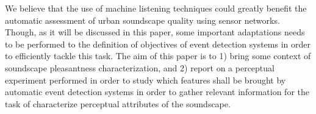 \documentclass{article}
\begin{document}
\begin{sloppy}



We believe that the use of machine listening techniques could greatly benefit the automatic assessment of urban soundscape quality using sensor networks. Though, as it will be discussed in this paper, some important adaptations needs to be performed to the definition of objectives of event detection systems in order to efficiently tackle this task. The aim of this paper is to 1) bring some context of soundscape pleasantness characterization, and 2) report on a perceptual experiment performed in order to study which features shall be brought by automatic event detection systems in order to gather relevant information for the task of characterize perceptual attributes of the soundscape.



\end{sloppy}
\end{document}
